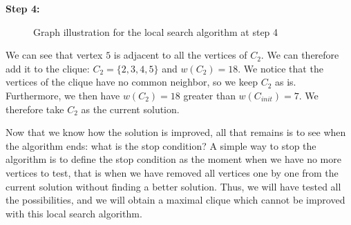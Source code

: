\begin{minipage}{\linewidth}
    \textbf{Step 4:} \newline
    
    \begin{minipage}{0.4\textwidth}
        \begin{figure}[H]
            \centering
            \caption{Graph illustration for the local search algorithm at step 4}
            \label{fig:local-search-mewc-neighbour-4}
        \end{figure}
    \end{minipage}
    \begin{minipage}{0.6\textwidth}
        We can see that vertex $5$ is adjacent to all the vertices of $C_2$. We can 
        therefore add it to the clique: $C_2 = \{2, 3, 4, 5\}$ and $w(C_2) = 18$. We 
        notice that the vertices of the clique have no common neighbor, so we keep 
        $C_2$ as is. Furthermore, we then have $w(C_2) = 18$ greater than $w(C_{init}) = 7$. We 
        therefore take $C_2$ as the current solution.
    \end{minipage}
\end{minipage}

\bigskip

Now that we know how the solution is improved, all that remains is to see when the algorithm 
ends: what is the stop condition? A simple way to stop the algorithm is to define the stop 
condition as the moment when we have no more vertices to test, that is when we have removed 
all vertices one by one from the current solution without finding a better solution.
\newpage
 Thus, 
we will have tested all the possibilities, and we will obtain a maximal clique which cannot 
be improved with this local search algorithm.